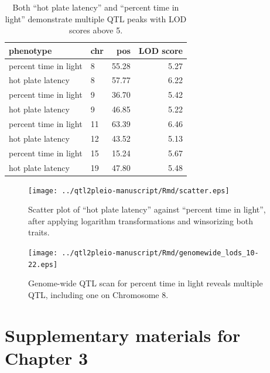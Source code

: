 \documentclass[oneside]{book}\usepackage[]{graphicx}\usepackage[]{color}
\begin{document}
\begin{appendices}
\begin{table}
\caption{Both ``hot plate latency'' and ``percent time in light''
  demonstrate multiple QTL peaks with LOD scores above 5.}
  \label{table-peaks}
\begin{center}
\begin{tabular}{l|lrr}
  \hline
phenotype & chr & pos & LOD score \\
   \hline
percent time in light & 8 & 55.28 & 5.27 \\
 hot plate latency & 8 & 57.77 & 6.22 \\
 percent time in light & 9 & 36.70 & 5.42 \\
 hot plate latency & 9 & 46.85 & 5.22 \\
 percent time in light & 11 & 63.39 & 6.46 \\
 hot plate latency & 12 & 43.52 & 5.13 \\
 percent time in light & 15 & 15.24 & 5.67 \\
 hot plate latency & 19 & 47.80 & 5.48 \\
   \hline
\end{tabular}
\end{center}
\end{table}







\clearpage



\begin{figure}
\texttt{[image: ../qtl2pleio-manuscript/Rmd/scatter.eps]}
\caption{Scatter plot of ``hot plate latency'' against ``percent time in
  light'', after applying logarithm transformations and winsorizing
  both traits.}
\label{fig:scatter}
\end{figure}


\begin{figure}
\texttt{[image: ../qtl2pleio-manuscript/Rmd/genomewide\_lods\_10-22.eps]}
\caption{Genome-wide QTL scan for percent time in light reveals
  multiple QTL, including one on Chromosome 8.}
\label{fig:genomewide10-22}
\end{figure}

\chapter{Supplementary materials for Chapter 3}


\end{appendices}
\end{document}
